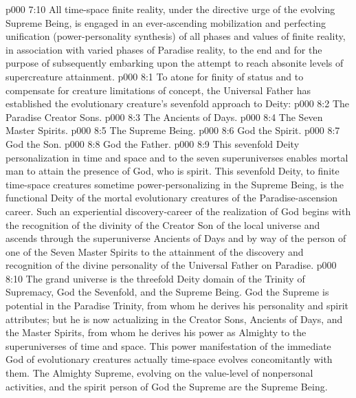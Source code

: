 \vs p000 7:10 All time\hyp{}space finite reality, under the directive urge of the evolving Supreme Being, is engaged in an ever\hyp{}ascending mobilization and perfecting unification (power\hyp{}personality synthesis) of all phases and values of finite reality, in association with varied phases of Paradise reality, to the end and for the purpose of subsequently embarking upon the attempt to reach absonite levels of supercreature attainment.
\vs p000 8:1 To atone for finity of status and to compensate for creature limitations of concept, the Universal Father has established the evolutionary creature’s sevenfold approach to Deity:
\vs p000 8:2 \bibnobreakspace The Paradise Creator Sons.
\vs p000 8:3 \bibnobreakspace The Ancients of Days.
\vs p000 8:4 \bibnobreakspace The Seven Master Spirits.
\vs p000 8:5 \bibnobreakspace The Supreme Being.
\vs p000 8:6 \bibnobreakspace God the Spirit.
\vs p000 8:7 \bibnobreakspace God the Son.
\vs p000 8:8 \bibnobreakspace God the Father.
\vs p000 8:9 \pc This sevenfold Deity personalization in time and space and to the seven superuniverses enables mortal man to attain the presence of God, who is spirit. This sevenfold Deity, to finite time\hyp{}space creatures sometime power\hyp{}personalizing in the Supreme Being, is the functional Deity of the mortal evolutionary creatures of the Paradise\hyp{}ascension career. Such an experiential discovery\hyp{}career of the realization of God begins with the recognition of the divinity of the Creator Son of the local universe and ascends through the superuniverse Ancients of Days and by way of the person of one of the Seven Master Spirits to the attainment of the discovery and recognition of the divine personality of the Universal Father on Paradise.
\vs p000 8:10 \pc The grand universe is the threefold Deity domain of the Trinity of Supremacy, God the Sevenfold, and the Supreme Being. God the Supreme is potential in the Paradise Trinity, from whom he derives his personality and spirit attributes; but he is now actualizing in the Creator Sons, Ancients of Days, and the Master Spirits, from whom he derives his power as Almighty to the superuniverses of time and space. This power manifestation of the immediate God of evolutionary creatures actually time\hyp{}space evolves concomitantly with them. The Almighty Supreme, evolving on the value\hyp{}level of nonpersonal activities, and the spirit person of God the Supreme are  the Supreme Being.
